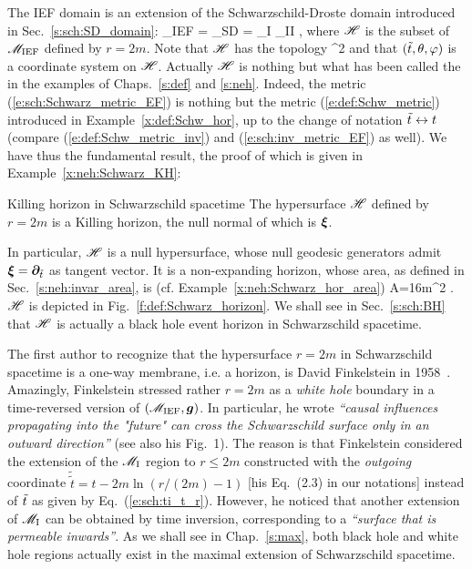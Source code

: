 The IEF domain is an extension of the Schwarzschild-Droste domain
introduced in Sec.~\ref{s:sch:SD_domain}:
\be
    \M_{\rm IEF} = \M_{\rm SD} \cup \Hor = \M_{\rm I} \cup \M_{\rm II} \cup \Hor ,
\ee
where $\mathscr{H}$ is the subset of $\mathscr{M}_{\rm IEF}$ defined by $r=2m$. Note that
$\mathscr{H}$ has the topology
\be
    \Hor \simeq \R\times\SS^2
\ee
and that $({\tilde t},\theta,\varphi)$ is a coordinate system on $\mathscr{H}$.
Actually $\mathscr{H}$ is nothing but what has been called the
 in the examples
of Chaps.~\ref{s:def} and \ref{s:neh}. Indeed, the metric
(\ref{e:sch:Schwarz_metric_EF}) is nothing but
the metric (\ref{e:def:Schw_metric}) introduced in Example~\ref{x:def:Schw_hor}, up to the change of notation ${\tilde t} \leftrightarrow t$ (compare (\ref{e:def:Schw_metric_inv}) and
(\ref{e:sch:inv_metric_EF}) as well).
We have thus the fundamental result,
the proof of which is given in Example~\ref{x:neh:Schwarz_KH}:
\begin{tprop}{Killing horizon in Schwarzschild spacetime}{}
The hypersurface $\mathscr{H}$ defined by $r=2m$
is a Killing horizon, the null normal of which is $\bm{\xi}$.
\end{tprop}
In particular, $\mathscr{H}$ is a null hypersurface, whose null geodesic generators
admit $\bm{\xi} = \bm{\partial}_{{\tilde t}}$ as tangent vector. It is a non-expanding horizon,
whose area, as defined in Sec.~\ref{s:neh:invar_area}, is (cf. Example~\ref{x:neh:Schwarz_hor_area})
\be
    A=16\pi m^2 .
\ee
$\mathscr{H}$ is depicted in Fig.~\ref{f:def:Schwarz_horizon}.
We shall see in Sec.~\ref{s:sch:BH} that $\mathscr{H}$ is actually a
black hole event horizon in Schwarzschild spacetime.

\begin{hist}
The first author to recognize that the hypersurface $r=2m$ in Schwarzschild spacetime
is a one-way membrane, i.e. a horizon, is David Finkelstein
in 1958~\cite{Finke58}. Amazingly, Finkelstein stressed rather $r=2m$
as a \emph{white hole} boundary in a time-reversed version of $(\mathscr{M}_{\rm IEF},\bm{g})$. In particular, he
wrote \emph{``causal influences propagating into the "future" can cross the Schwarzschild surface only
in an outward direction''} (see also his Fig.~1). The reason is that Finkelstein considered
the extension of the $\mathscr{M}_{\rm I}$ region to $r\leq 2m$ constructed with
the \emph{outgoing}
coordinate $\tilde{\tilde t} = t - 2 m \ln ( {r}/(2m) - 1 )$ [his Eq.~(2.3) in our notations] instead of ${\tilde t}$ as given by Eq.~(\ref{e:sch:ti_t_r}). However, he noticed that another
extension of $\mathscr{M}_{\rm I}$ can be obtained by time inversion,
corresponding to a \emph{``surface that is permeable inwards''}. As we shall see in Chap.~\ref{s:max},
both black hole and white hole regions actually exist in the maximal extension
of Schwarzschild spacetime.
\end{hist}


